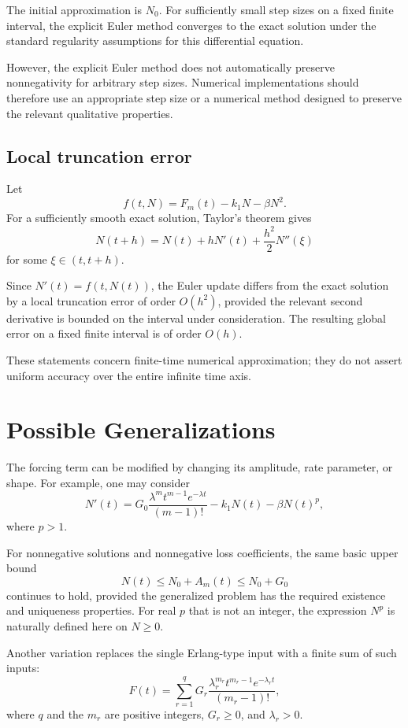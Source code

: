 \documentclass[12pt]{article}
\theoremstyle{definition}
\theoremstyle{remark}
\begin{document}
The initial approximation is \(N_0\). For sufficiently
small step sizes on a fixed finite interval, the explicit
Euler method converges to the exact solution under the
standard regularity assumptions for this differential
equation.

However, the explicit Euler method does not automatically
preserve nonnegativity for arbitrary step sizes. Numerical
implementations should therefore use an appropriate step
size or a numerical method designed to preserve the
relevant qualitative properties.

\subsection{Local truncation error}

Let
\[
f(t,N)=F_m(t)-k_1N-\beta N^2.
\]
For a sufficiently smooth exact solution, Taylor's
theorem gives
\[
N(t+h)=N(t)+hN'(t)+\frac{h^2}{2}N''(\xi)
\]
for some \(\xi\in(t,t+h)\).

Since \(N'(t)=f(t,N(t))\), the Euler update differs
from the exact solution by a local truncation error
of order \(O(h^2)\), provided the relevant second
derivative is bounded on the interval under
consideration. The resulting global error on a fixed
finite interval is of order \(O(h)\).

These statements concern finite-time numerical
approximation; they do not assert uniform accuracy over
the entire infinite time axis.

\section{Possible Generalizations}

The forcing term can be modified by changing its amplitude,
rate parameter, or shape. For example, one may consider
\begin{equation}
N'(t)
=
G_0\frac{\lambda^m t^{m-1}e^{-\lambda t}}{(m-1)!}
-k_1N(t)-\beta N(t)^p,
\label{eq:generalized-model}
\end{equation}
where \(p>1\).

For nonnegative solutions and nonnegative loss
coefficients, the same basic upper bound
\[
N(t)\leq N_0+A_m(t)\leq N_0+G_0
\]
continues to hold, provided the generalized problem
has the required existence and uniqueness properties.
For real \(p\) that is not an integer, the expression
\(N^p\) is naturally defined here on \(N\geq 0\).

Another variation replaces the single Erlang-type input
with a finite sum of such inputs:
\[
F(t)=
\sum_{r=1}^{q}
G_r\frac{\lambda_r^{m_r}t^{m_r-1}
e^{-\lambda_r t}}{(m_r-1)!},
\]
where \(q\) and the \(m_r\) are positive integers,
\(G_r\geq 0\), and \(\lambda_r>0\).
\end{document}
